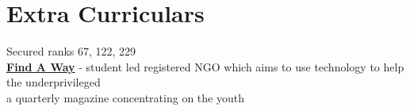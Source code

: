 \documentclass[]{deedy-resume-openfont}
\begin{document}
\begin{minipage}[t]{0.33\textwidth}
\section{Extra Curriculars}
 Secured ranks 67, 122, 229\\\vspace{6pt}
\vspace{6pt}
 \textbf{\href{http://findaway.in/}{Find A Way}} - student led registered NGO which aims to use technology to help the underprivileged\\\vspace{6pt}
 a quarterly magazine concentrating on the youth



%
%

\end{minipage} 
\hfill
\end{document}
